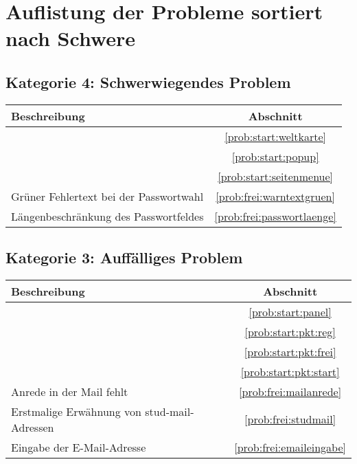 \section{Auflistung der Probleme sortiert nach Schwere}

\subsection*{Kategorie 4: Schwerwiegendes Problem}
\begin{tabular}{|p{12cm}|c|}
\hline
\textbf{Beschreibung} & \textbf{Abschnitt} \\
\hline\hline
\nameref{prob:start:weltkarte} & \ref{prob:start:weltkarte} \\ 
\nameref{prob:start:popup} & \ref{prob:start:popup}\\
\nameref{prob:start:seitenmenue} & \ref{prob:start:seitenmenue}\\
Grüner Fehlertext bei der Passwortwahl & \ref{prob:frei:warntextgruen}\\
Längenbeschränkung des Passwortfeldes & \ref{prob:frei:passwortlaenge}\\
\hline
\end{tabular}

\subsection*{Kategorie 3: Auffälliges Problem}
\begin{tabular}{|p{12cm}|c|}
\hline
\textbf{Beschreibung} & \textbf{Abschnitt} \\
\hline\hline
\nameref{prob:start:panel} & \ref{prob:start:panel} \\
\nameref{prob:start:pkt:reg} & \ref{prob:start:pkt:reg}\\
\nameref{prob:start:pkt:frei} & \ref{prob:start:pkt:frei}\\
\nameref{prob:start:pkt:start} & \ref{prob:start:pkt:start}\\
Anrede in der Mail fehlt & \ref{prob:frei:mailanrede}\\
Erstmalige Erwähnung von stud-mail-Adressen & \ref{prob:frei:studmail}\\
Eingabe der E-Mail-Adresse & \ref{prob:frei:emaileingabe}\\
\hline

\end{tabular}

